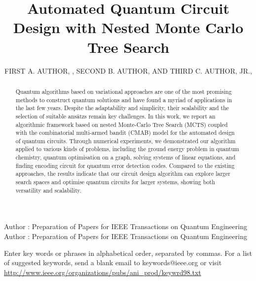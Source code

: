 \documentclass{ieeeaccess}
\begin{document}

\title{Automated Quantum Circuit Design with Nested Monte Carlo Tree Search}
\author{\uppercase{First A. Author}, ,
\uppercase{Second B. Author, and Third C. Author,
Jr}.,
}
\address[1]{National Institute of Standards and 
Technology, Boulder, CO 80305 USA (email: author@boulder.nist.gov)}
\address[2]{Department of Physics, Colorado State University, Fort Collins, 
CO 80523 USA (email: author@lamar.colostate.edu)}
\address[3]{Electrical Engineering Department, University of Colorado, Boulder, CO 
80309 USA}

\markboth
{Author \headeretal: Preparation of Papers for IEEE Transactions on Quantum Engineering}
{Author \headeretal: Preparation of Papers for IEEE Transactions on Quantum Engineering}


\begin{abstract}
Quantum algorithms based on variational approaches are one of the most promising methods to construct quantum solutions and have found a myriad of applications in the last few years. Despite the adaptability and simplicity, their scalability and the selection of suitable ans\"atzs remain key challenges. In this work, we report an algorithmic framework based on nested Monte-Carlo Tree Search (MCTS) coupled with the combinatorial multi-armed bandit (CMAB) model  for the automated design of quantum circuits. Through numerical experiments, we demonstrated our algorithm applied to various kinds of problems, including the ground energy problem in quantum chemistry, quantum optimisation on a graph, solving  systems of linear equations, and finding encoding circuit for quantum error detection codes. Compared to the existing approaches, the results indicate that our circuit design algorithm can explore larger search spaces and optimise quantum circuits for larger systems, showing both versatility and scalability.
\end{abstract}

\begin{keywords}
Enter key words or phrases in alphabetical 
order, separated by commas. For a list of suggested keywords, send a blank 
email to keywords@ieee.org or visit \underline
{http://www.ieee.org/organizations/pubs/ani\_prod/keywrd98.txt}
\end{keywords}
\end{document}
